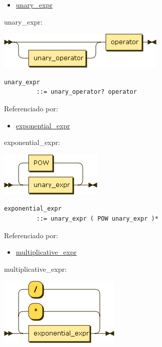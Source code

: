 \begin{itemize}
\tightlist
\item
  \protect\hyperlink{unary_expr}{unary\_expr}
\end{itemize}

\protect\hypertarget{unary_expr}{}{unary\_expr:}

\includegraphics[width=3.16667in,height=0.70833in]{diagram/unary_expr.png}

\begin{verbatim}
unary_expr
         ::= unary_operator? operator
\end{verbatim}

Referenciado por:

\begin{itemize}
\tightlist
\item
  \protect\hyperlink{exponential_expr}{exponential\_expr}
\end{itemize}

\protect\hypertarget{exponential_expr}{}{exponential\_expr:}

\includegraphics[width=1.93750in,height=0.83333in]{diagram/exponential_expr.png}

\begin{verbatim}
exponential_expr
         ::= unary_expr ( POW unary_expr )*
\end{verbatim}

Referenciado por:

\begin{itemize}
\tightlist
\item
  \protect\hyperlink{multiplicative_expr}{multiplicative\_expr}
\end{itemize}

\protect\hypertarget{multiplicative_expr}{}{multiplicative\_expr:}

\includegraphics[width=2.29167in,height=1.29167in]{diagram/multiplicative_expr.png}

